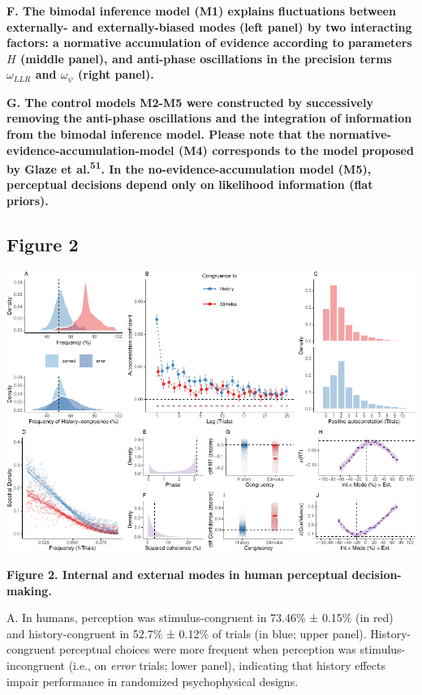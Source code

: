 \documentclass[
]{article}
\begin{document}
\textbf{F. The bimodal inference model (M1) explains fluctuations
between externally- and externally-biased modes (left panel) by two
interacting factors: a normative accumulation of evidence according to
parameters \(H\) (middle panel), and anti-phase oscillations in the
precision terms \(\omega_{LLR}\) and \(\omega_{\psi}\) (right panel).}

\textbf{G. The control models M2-M5 were constructed by successively
removing the anti-phase oscillations and the integration of information
from the bimodal inference model. Please note that the
normative-evidence-accumulation-model (M4) corresponds to the model
proposed by Glaze et al.\textsuperscript{51}. In the
no-evidence-accumulation model (M5), perceptual decisions depend only on
likelihood information (flat priors).}

\newpage

\hypertarget{figure-2}{%
\subsection{Figure 2}\label{figure-2}}

\includegraphics{modes_mouse_rev1b_files/figure-latex/Figure_2-1.pdf}

\textbf{Figure 2. Internal and external modes in human perceptual
decision-making.}

A. In humans, perception was stimulus-congruent in 73.46\% ± 0.15\% (in
red) and history-congruent in 52.7\% ± 0.12\% of trials (in blue; upper
panel). History-congruent perceptual choices were more frequent when
perception was stimulus-incongruent (i.e., on \emph{error} trials; lower
panel), indicating that history effects impair performance in randomized
psychophysical designs.
\end{document}
